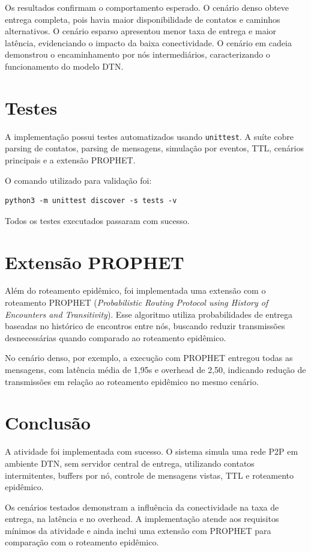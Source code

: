 \documentclass[12pt,a4paper]{article}
\begin{document}
Os resultados confirmam o comportamento esperado. O cenário denso obteve entrega completa,
pois havia maior disponibilidade de contatos e caminhos alternativos. O cenário esparso
apresentou menor taxa de entrega e maior latência, evidenciando o impacto da baixa
conectividade. O cenário em cadeia demonstrou o encaminhamento por nós intermediários,
caracterizando o funcionamento do modelo DTN.

\section{Testes}

A implementação possui testes automatizados usando \texttt{unittest}. A suíte cobre parsing
de contatos, parsing de mensagens, simulação por eventos, TTL, cenários principais e a
extensão PROPHET.

O comando utilizado para validação foi:

\begin{lstlisting}
python3 -m unittest discover -s tests -v
\end{lstlisting}

Todos os testes executados passaram com sucesso.

\section{Extensão PROPHET}

Além do roteamento epidêmico, foi implementada uma extensão com o roteamento PROPHET
(\textit{Probabilistic Routing Protocol using History of Encounters and Transitivity}).
Esse algoritmo utiliza probabilidades de entrega baseadas no histórico de encontros entre
nós, buscando reduzir transmissões desnecessárias quando comparado ao roteamento epidêmico.

No cenário denso, por exemplo, a execução com PROPHET entregou todas as mensagens, com
latência média de 1,95s e overhead de 2,50, indicando redução de transmissões em relação
ao roteamento epidêmico no mesmo cenário.

\section{Conclusão}

A atividade foi implementada com sucesso. O sistema simula uma rede P2P em ambiente DTN,
sem servidor central de entrega, utilizando contatos intermitentes, buffers por nó,
controle de mensagens vistas, TTL e roteamento epidêmico.

Os cenários testados demonstram a influência da conectividade na taxa de entrega, na
latência e no overhead. A implementação atende aos requisitos mínimos da atividade e ainda
inclui uma extensão com PROPHET para comparação com o roteamento epidêmico.
\end{document}
